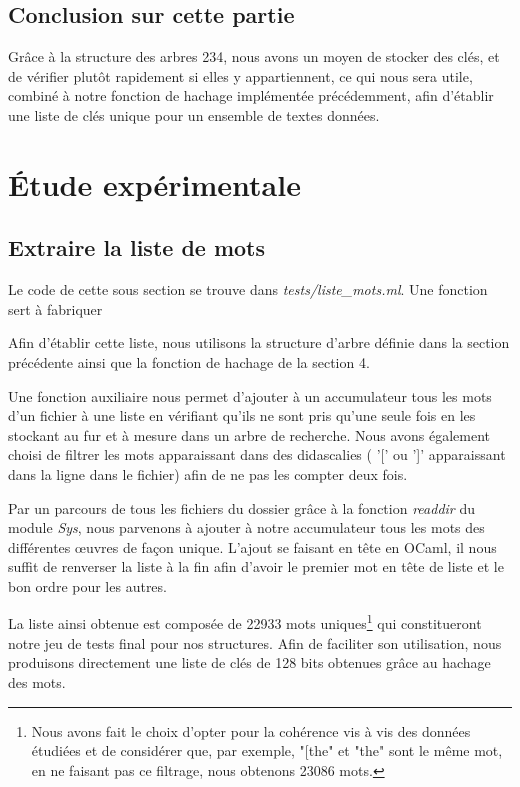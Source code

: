 \documentclass[12pt,a4paper]{article}
\begin{document}
\subsection{Conclusion sur cette partie}

Grâce à la structure des arbres 234, nous avons un moyen de stocker des clés, et de vérifier plutôt rapidement si elles y appartiennent, ce qui nous sera utile, combiné à notre fonction de hachage implémentée précédemment, afin d'établir une liste de clés unique pour un ensemble de textes données.

 \section{Étude expérimentale}

\subsection{Extraire la liste de mots}

Le code de cette sous section se trouve dans \textit{tests/liste\_mots.ml}. Une fonction sert à fabriquer 

Afin d'établir cette liste, nous utilisons la structure d'arbre définie dans la section précédente ainsi que la fonction de hachage de la section 4.

Une fonction auxiliaire nous permet d'ajouter à un accumulateur tous les mots d'un fichier à une liste en vérifiant qu'ils ne sont pris qu'une seule fois en les stockant au fur et à mesure dans un arbre de recherche. Nous avons également choisi de filtrer les mots apparaissant dans des didascalies ( '[' ou ']' apparaissant dans la ligne dans le fichier) afin de ne pas les compter deux fois.

Par un parcours de tous les fichiers du dossier grâce à la fonction \textit{readdir} du module \textit{Sys}, nous parvenons à ajouter à notre accumulateur tous les mots des différentes œuvres de façon unique. L'ajout se faisant en tête en OCaml, il nous suffit de renverser la liste à la fin afin d'avoir le premier mot en tête de liste et le bon ordre pour les autres.

La liste ainsi obtenue est composée de 22933 mots uniques\footnote{Nous avons fait le choix d'opter pour la cohérence vis à vis des données étudiées et de considérer que, par exemple, "[the" et "the" sont le même mot, en ne faisant pas ce filtrage, nous obtenons 23086 mots.} qui constitueront notre jeu de tests final pour nos structures. Afin de faciliter son utilisation, nous produisons directement une liste de clés de 128 bits obtenues grâce au hachage des mots. 
\end{document}
